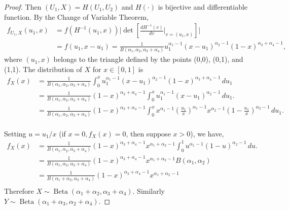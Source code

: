 \documentclass[a4paper, notitlepage, 11pt]{article}
\newcommand{\betadist}{\operatorname{Beta}}
\theoremstyle{definition}
\theoremstyle{remark}
\begin{document}
\begin{proof}
Then $(U_1, X) = H(U_1, U_2)$ and $H(\cdot)$ is bijective and differentiable function. By the Change of Variable Theorem, 
\begin{equation}
  \begin{split}
    f_{U_1, X}(u_1, x) &= f({H^{-1}(u_1,x)})\bigg|\det\left[\frac{dH^{-1}(v)}{dv}\bigg|_{v=(u_1,x)}\right]\bigg| \\ 
    &= f(u_1, x - u_1) = \frac{1}{B(\alpha_1, \alpha_2, \alpha_3+\alpha_4)}u_1^{\alpha_1-1}(x-u_1)^{\alpha_2-1}(1-x)^{\alpha_3+\alpha_4-1}, 
  \end{split}
\end{equation}
where $(u_1, x)$ belongs to the triangle defined by the points (0,0),
(0,1), and (1,1). The distribution of $X$ for $x \in [0,1]$ is
\begin{equation}
  \begin{split}
    f_X(x) &= \frac{1}{B(\alpha_1, \alpha_2, \alpha_3+\alpha_4)}\int_{0}^{x} u_1^{\alpha_1-1}(x-u_1)^{\alpha_2-1}(1-x)^{\alpha_3+\alpha_4-1} \, du_1 \\
    &= \frac{1}{B(\alpha_1, \alpha_2, \alpha_3+\alpha_4)}(1-x)^{\alpha_3+\alpha_4-1} \int_{0}^{x} u_1^{\alpha_1-1}(x-u_1)^{\alpha_2-1} \, du_1. \\
    &= \frac{1}{B(\alpha_1, \alpha_2, \alpha_3+\alpha_4)}(1-x)^{\alpha_3+\alpha_4-1} \int_{0}^{x} x^{\alpha_1-1} \left(\frac{u_1}{x}\right)^{\alpha_1-1}x^{\alpha_2 - 1}\left(1-\frac{u_1}{x}\right)^{\alpha_2-1} \, du_1. \\
  \end{split}
\end{equation}

Setting $u = u_1/x$ (if $x = 0, f_X(x) = 0$, then suppose $x > 0$), we have, 
\begin{equation}
  \begin{split}
    f_X(x) &= \frac{1}{B(\alpha_1, \alpha_2, \alpha_3+\alpha_4)}(1-x)^{\alpha_3+\alpha_4-1} x^{\alpha_1+\alpha_2-1} \int_{0}^{1} u^{\alpha_1-1}(1-u)^{\alpha_2-1} \, du. \\
    &= \frac{1}{B(\alpha_1, \alpha_2, \alpha_3+\alpha_4)}(1-x)^{\alpha_3+\alpha_4-1} x^{\alpha_1+\alpha_2-1} B(\alpha_1, \alpha_2)\\
    &= \frac{1}{B(\alpha_1 + \alpha_2, \alpha_3+\alpha_4)}(1-x)^{\alpha_3+\alpha_4-1} x^{\alpha_1+\alpha_2-1}\\
  \end{split}
\end{equation}
Therefore $X \sim \betadist(\alpha_1+\alpha_2, \alpha_3+\alpha_4)$. Similarly $Y \sim \betadist(\alpha_1+\alpha_3, \alpha_2 + \alpha_4)$.

\end{proof}
\end{document}

